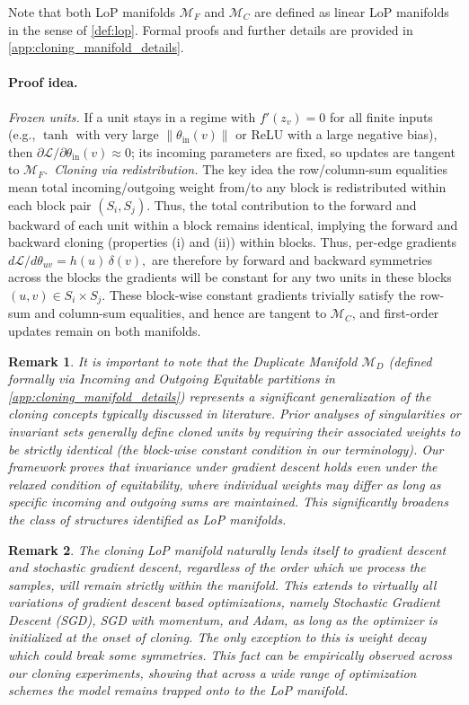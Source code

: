 \documentclass{article}
\newtheorem{remark}{Remark}[section]
\numberwithin{figure}{section}
\begin{document}
Note that both LoP manifolds $\mathcal{M}_F$ and $\mathcal{M}_C$ are defined as  linear LoP manifolds in the sense of \cref{def:lop}. Formal proofs and further details are provided in \cref{app:cloning_manifold_details}.

\vspace{-7pt}
\paragraph{Proof idea.}
\emph{Frozen units.} If a unit stays in a regime with $f'(z_v)=0$ for all finite inputs (e.g., $\tanh$ with very large $\lVert\theta_{\mathrm{in}}(v)\rVert$ or ReLU with a large negative bias), then $\partial \mathcal{L}/\partial \theta_{\mathrm{in}}(v)\approx 0$; its incoming parameters are fixed, so updates are tangent to $\mathcal{M}_F$.\
\emph{Cloning via redistribution.} The key idea the row/column-sum equalities mean total incoming/outgoing  weight from/to any block is redistributed within each block pair $(S_i,S_j)$. Thus, the total contribution to the forward and backward of each unit within a block remains identical, implying the forward and backward cloning (properties (i) and (ii)) within blocks. Thus, per-edge gradients $d\mathcal{L}/d\theta_{uv}=h(u)\,\delta(v),$ are therefore by forward and backward symmetries across the blocks the gradients will be constant for any two units in these blocks $(u,v)\in S_i\times S_j$. These block-wise constant gradients trivially satisfy the row-sum and column-sum equalities, and hence are tangent to $\mathcal{M}_C$, and first-order updates remain on both manifolds.
\begin{remark}
It is important to note that the Duplicate Manifold $\mathcal{M}_D$ (defined formally via Incoming and Outgoing Equitable partitions in \cref{app:cloning_manifold_details}) represents a significant generalization of the cloning concepts typically discussed in literature. Prior analyses of singularities \citep{fukumizu2000local} or invariant sets \citep{chen2023stochastic} generally define cloned units by requiring their associated weights to be strictly identical (the block-wise constant condition in our terminology). Our framework proves that invariance under gradient descent holds even under the relaxed condition of equitability, where individual weights may differ as long as specific incoming and outgoing sums are maintained. This significantly broadens the class of structures identified as LoP manifolds.
\end{remark}
\begin{remark}\label{rem:optimizers}
The cloning LoP manifold naturally lends itself to gradient descent and stochastic gradient descent, regardless of the order which we process the samples, will remain strictly within the manifold. This extends to virtually all variations of gradient descent based optimizations, namely Stochastic Gradient Descent (SGD), SGD with momentum, and Adam, as long as the optimizer is initialized at the onset of cloning. The only exception to this is weight decay which could break some symmetries. This fact can be empirically observed across our cloning experiments, showing that across a wide range of optimization schemes the model remains trapped onto to the LoP manifold.
\end{remark}
\end{document}
